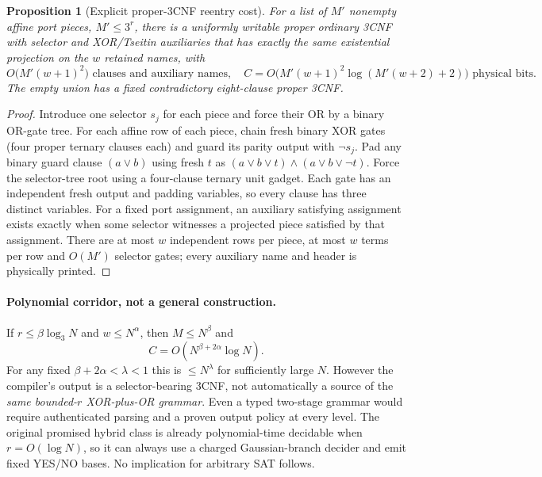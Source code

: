 \documentclass[11pt]{article}
\newtheorem{proposition}[theorem]{Proposition}
\begin{document}
\begin{proposition}[Explicit proper-3CNF reentry cost]
For a list of $M'$ nonempty affine port pieces, $M'\le3^r$, there is a uniformly writable \emph{proper} ordinary 3CNF with selector and XOR/Tseitin auxiliaries that has exactly the same existential projection on the $w$ retained names, with
\[
 O\bigl(M'(w+1)^2\bigr)\text{ clauses and auxiliary names},\quad
 \boxed{C=O\bigl(M'(w+1)^2\log(M'(w+2)+2)\bigr)}\text{ physical bits.}
\]
The empty union has a fixed contradictory eight-clause proper 3CNF.
\end{proposition}
\begin{proof}
Introduce one selector $s_j$ for each piece and force their OR by a binary OR-gate tree. For each affine row of each piece, chain fresh binary XOR gates (four proper ternary clauses each) and guard its parity output with $\neg s_j$. Pad any binary guard clause $(a\vee b)$ using fresh $t$ as $(a\vee b\vee t)\wedge(a\vee b\vee\neg t)$. Force the selector-tree root using a four-clause ternary unit gadget. Each gate has an independent fresh output and padding variables, so every clause has three distinct variables. For a fixed port assignment, an auxiliary satisfying assignment exists exactly when some selector witnesses a projected piece satisfied by that assignment. There are at most $w$ independent rows per piece, at most $w$ terms per row and $O(M')$ selector gates; every auxiliary name and header is physically printed.
\end{proof}

\paragraph{Polynomial corridor, not a general construction.} If $r\le\beta\log_3 N$ and $w\le N^\alpha$, then $M\le N^\beta$ and
\[
 C=O(N^{\beta+2\alpha}\log N).
\]
For any fixed $\beta+2\alpha<\lambda<1$ this is $\le N^\lambda$ for sufficiently large $N$. However the compiler's output is a selector-bearing 3CNF, not automatically a source of the \emph{same bounded-$r$ XOR-plus-OR grammar}. Even a typed two-stage grammar would require authenticated parsing and a proven output policy at every level. The original promised hybrid class is already polynomial-time decidable when $r=O(\log N)$, so it can always use a charged Gaussian-branch decider and emit fixed YES/NO bases. No implication for arbitrary SAT follows.
\end{document}
